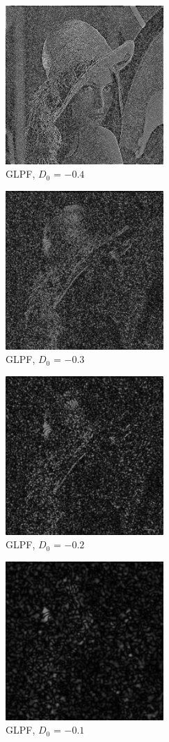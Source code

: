 \documentclass[conference]{IEEEtran}
\begin{document}
\begin{figure}[H]
\centerline{\includegraphics[width=6cm]{GLPF-0_4.jpg}}
\caption{GLPF, $D_0$ = $-0.4$}
\label{GLPF-0.4}
\end{figure}

\begin{figure}[H]
\centerline{\includegraphics[width=6cm]{GLPF-0_3.jpg}}
\caption{GLPF, $D_0$ = $-0.3$}
\label{GLPF-0.3}
\end{figure}

\begin{figure}[H]
\centerline{\includegraphics[width=6cm]{GLPF-0_2.jpg}}
\caption{GLPF, $D_0$ = $-0.2$}
\label{GLPF-0.2}
\end{figure}

\begin{figure}[H]
\centerline{\includegraphics[width=6cm]{GLPF-0_1.jpg}}
\caption{GLPF, $D_0$ = $-0.1$}
\label{GLPF-0.1}
\end{figure}
\end{document}
